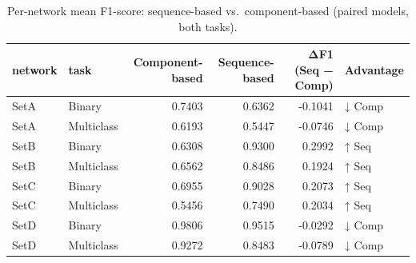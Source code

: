 \begin{table}
\caption{Per-network mean F1-score: sequence-based vs.\ component-based (paired models, both tasks).}
\label{tab:q1_per_network}
\begin{tabular}{llrrrl}
\toprule
network & task & Component-based & Sequence-based & ΔF1 (Seq − Comp) & Advantage \\
\midrule
SetA & Binary & 0.7403 & 0.6362 & -0.1041 & ↓ Comp \\
SetA & Multiclass & 0.6193 & 0.5447 & -0.0746 & ↓ Comp \\
SetB & Binary & 0.6308 & 0.9300 & 0.2992 & ↑ Seq \\
SetB & Multiclass & 0.6562 & 0.8486 & 0.1924 & ↑ Seq \\
SetC & Binary & 0.6955 & 0.9028 & 0.2073 & ↑ Seq \\
SetC & Multiclass & 0.5456 & 0.7490 & 0.2034 & ↑ Seq \\
SetD & Binary & 0.9806 & 0.9515 & -0.0292 & ↓ Comp \\
SetD & Multiclass & 0.9272 & 0.8483 & -0.0789 & ↓ Comp \\
\bottomrule
\end{tabular}
\end{table}
